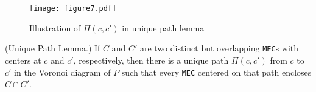 \documentclass[12pt]{llncs}
\begin{document}
\begin{figure}[h]
\begin{center} 
\texttt{[image: figure7.pdf]}\\
 \end{center}
\caption{Illustration of $\Pi(c,c')$ in unique path lemma} 
\label{fig:nsp}
\end{figure}




\begin{lemma}(Unique Path Lemma.)
If $C$ and $C'$ are two distinct but overlapping {\tt MEC}s with centers
at $c$ and $c'$, respectively, then there is a unique path $\Pi(c,c')$ 
from $c$ to $c'$ in  the Voronoi diagram of $P$ such that every {\tt MEC} centered 
on that path encloses $C\cap C'$.
\end{lemma}
\end{document}
